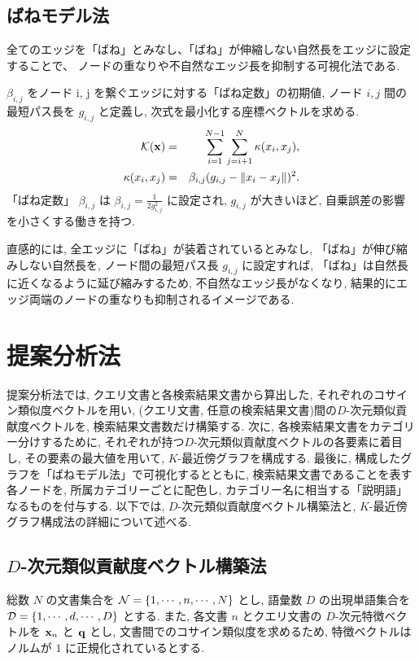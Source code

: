\documentclass[a4paper,12pt]{jsreport}
\begin{document}
\section{ばねモデル法}

全てのエッジを「ばね」とみなし、「ばね」が伸縮しない自然長をエッジに設定することで、
ノードの重なりや不自然なエッジ長を抑制する可視化法である\cite{kamada89}.

$\beta_{i,j}$ をノード i, j を繋ぐエッジに対する「ばね定数」の初期値,
ノード $i, j$ 間の最短パス長を $g_{i,j}$ と定義し,
次式を最小化する座標ベクトルを求める. 
\begin{eqnarray}
{\cal K}({\bf x}) & = & \sum_{i=1}^{N-1} \sum_{j=i+1}^{N} \kappa(x_i, x_j), \label{spring} \\
\kappa(x_i, x_j) & = & \beta_{i,j}(g_{i,j} - \|x_i - x_j\|)^2. 
\label{spring2}
\end{eqnarray}
「ばね定数」 $\beta_{i,j}$ は $\beta_{i,j}= \frac{1}{2g_{i,j}^2}$ に設定され, 
$g_{i,j}$ が大きいほど, 自乗誤差の影響を小さくする働きを持つ. 

直感的には, 全エッジに「ばね」が装着されているとみなし, 
「ばね」が伸び縮みしない自然長を, ノード間の最短パス長 $g_{i,j}$ に設定すれば, 
「ばね」は自然長に近くなるように延び縮みするため, 不自然なエッジ長がなくなり,
結果的にエッジ両端のノードの重なりも抑制されるイメージである.

\newpage

\chapter{提案分析法}
提案分析法では,  クエリ文書と各検索結果文書から算出した, それぞれのコサイン類似度ベクトルを用い, 
(クエリ文書, 任意の検索結果文書)間の$D$-次元類似貢献度ベクトルを, 検索結果文書数だけ構築する.  
次に, 各検索結果文書をカテゴリー分けするために, 
それぞれが持つ$D$-次元類似貢献度ベクトルの各要素に着目し, 
その要素の最大値を用いて, $K$-最近傍グラフを構成する.
最後に, 構成したグラフを「ばねモデル法」で可視化するとともに, 
検索結果文書であることを表す各ノードを, 所属カテゴリーごとに配色し,
カテゴリー名に相当する「説明語」なるものを付与する.
以下では, $D$-次元類似貢献度ベクトル構築法と, $K$-最近傍グラフ構成法の詳細について述べる. 

\section{$D$-次元類似貢献度ベクトル構築法}

総数 $N$ の文書集合を ${\cal N} = \{1, \cdots, n, \cdots, N \}$ とし, 
語彙数 $D$ の出現単語集合を ${\cal D} = \{1, \cdots, d, \cdots, D \}$ とする. 
また, 各文書 $n$ とクエリ文書の $D$-次元特徴ベクトルを ${\bf x}_n$ と ${\bf q}$ とし,  
文書間でのコサイン類似度を求めるため, 特徴ベクトルはノルムが $1$ に正規化されているとする. 
\end{document}
